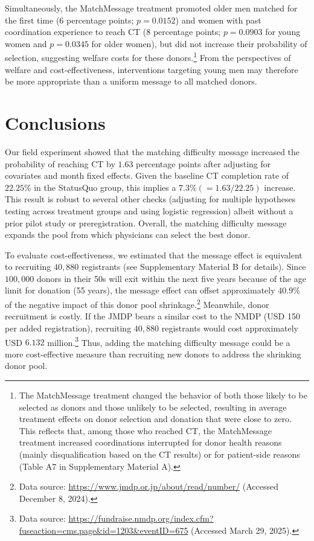 \documentclass[12pt, a4paper]{article}
\begin{document}
Simultaneously, the MatchMessage treatment promoted older men matched for the first time (6 percentage points; \(p = 0.0152\)) and women with past coordination experience to reach CT (8 percentage points; \(p = 0.0903\) for young women and \(p = 0.0345\) for older women), but did not increase their probability of selection, suggesting welfare costs for these donors.\footnote{The MatchMessage treatment changed the behavior of both those likely to be selected as donors and those unlikely to be selected, resulting in average treatment effects on donor selection and donation that were close to zero. This reflects that, among those who reached CT, the MatchMessage treatment increased coordinations interrupted for donor health reasons (mainly disqualification based on the CT results) or for patient-side reasons (Table A7 in Supplementary Material A).} From the perspectives of welfare and cost-effectiveness, interventions targeting young men may therefore be more appropriate than a uniform message to all matched donors.

\hypertarget{conclusion}{%
\section{Conclusions}\label{conclusion}}

Our field experiment showed that the matching difficulty message increased the probability of reaching CT by \(1.63\) percentage points after adjusting for covariates and month fixed effects. Given the baseline CT completion rate of \(22.25\)\% in the StatusQuo group, this implies a \(7.3\% (= 1.63/22.25)\) increase. This result is robust to several other checks (adjusting for multiple hypotheses testing across treatment groups and using logistic regression) albeit without a prior pilot study or preregistration. Overall, the matching difficulty message expands the pool from which physicians can select the best donor.

To evaluate cost-effectiveness, we estimated that the message effect is equivalent to recruiting \(40,880\) registrants (see Supplementary Material B for details). Since \(100,000\) donors in their 50s will exit within the next five years because of the age limit for donation (55 years), the message effect can offset approximately \(40.9\)\% of the negative impact of this donor pool shrinkage.\footnote{Data source: \url{https://www.jmdp.or.jp/about/read/number/} (Accessed December 8, 2024).} Meanwhile, donor recruitment is costly. If the JMDP bears a similar cost to the NMDP (USD 150 per added registration), recruiting \(40,880\) registrants would cost approximately USD \(6.132\) million.\footnote{Data source: \url{https://fundraise.nmdp.org/index.cfm?fuseaction=cms.page\&id=1203\&eventID=675} (Accessed March 29, 2025).} Thus, adding the matching difficulty message could be a more cost-effective measure than recruiting new donors to address the shrinking donor pool.
\end{document}
